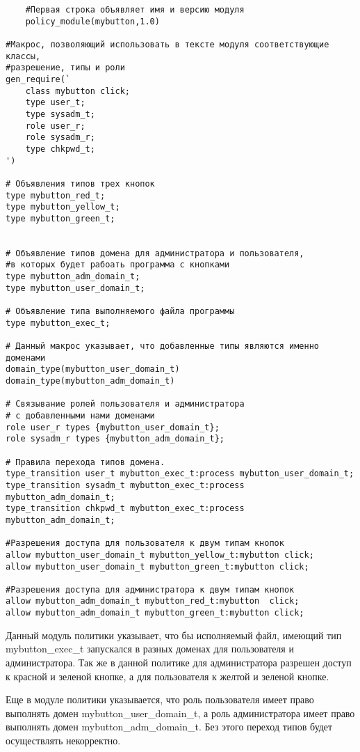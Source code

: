 \documentclass{./../class/UIR}
\begin{document}
	\begin{verbatim}
	#Первая строка объявляет имя и версию модуля
	policy_module(mybutton,1.0)

#Макрос, позволяющий использовать в тексте модуля соответствующие классы,
#разрешение, типы и роли
gen_require(` 
    class mybutton click;
    type user_t;
    type sysadm_t;
    role user_r;	
    role sysadm_r;
    type chkpwd_t;
')

# Объявления типов трех кнопок
type mybutton_red_t;
type mybutton_yellow_t;
type mybutton_green_t;


# Объявление типов домена для администратора и пользователя, 
#в которых будет рабоать программа с кнопками
type mybutton_adm_domain_t;
type mybutton_user_domain_t;

# Объявление типа выполняемого файла программы
type mybutton_exec_t;

# Данный макрос указывает, что добавленные типы являются именно доменами
domain_type(mybutton_user_domain_t)
domain_type(mybutton_adm_domain_t)

# Связывание ролей пользователя и администратора 
# с добавленными нами доменами
role user_r types {mybutton_user_domain_t};
role sysadm_r types {mybutton_adm_domain_t};

# Правила перехода типов домена. 
type_transition user_t mybutton_exec_t:process mybutton_user_domain_t; 
type_transition sysadm_t mybutton_exec_t:process mybutton_adm_domain_t;
type_transition chkpwd_t mybutton_exec_t:process mybutton_adm_domain_t;

#Разрешения доступа для пользователя к двум типам кнопок
allow mybutton_user_domain_t mybutton_yellow_t:mybutton click;
allow mybutton_user_domain_t mybutton_green_t:mybutton click;

#Разрешения доступа для администратора к двум типам кнопок
allow mybutton_adm_domain_t mybutton_red_t:mybutton  click;
allow mybutton_adm_domain_t mybutton_green_t:mybutton click;

\end{verbatim}
	Данный модуль политики указывает, что бы исполняемый файл, имеющий тип
	mybutton\_exec\_t запускался в разных доменах для пользователя и
	администратора. Так же в данной политике для администратора разрешен доступ к
	красной и зеленой кнопке, а для пользователя к желтой и зеленой кнопке. 
	
	Еще в модуле политики указывается, что роль пользователя имеет право выполнять
	домен mybutton\_user\_domain\_t, а роль администратора имеет право выполнять
	домен mybutton\_adm\_domain\_t. Без этого переход типов будет осуществлять
	некорректно.
	
\end{document}
